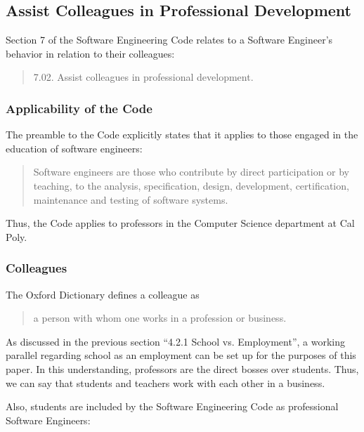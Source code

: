 \documentclass[11pt]{article}
\begin{document}
\begin{multicols}{2}
\subsection{Assist Colleagues in Professional Development}

Section 7 of the Software Engineering Code relates to a Software Engineer's behavior in relation to their colleagues:

\begin{quote}
7.02. Assist colleagues in professional development.\cite{secode}
\end{quote}

\subsubsection{Applicability of the Code}

The preamble to the Code explicitly states that it applies to those engaged in the education of software engineers:

\begin{quote}
Software engineers are those who contribute by direct participation or by teaching, to the analysis, specification, design, development, certification, maintenance and testing of software systems. \cite{secode}
\end{quote}

Thus, the Code applies to professors in the Computer Science department at Cal Poly.

\subsubsection{Colleagues}

The Oxford Dictionary defines a colleague as

\begin{quote}
a person with whom one works in a profession or business. \cite{definitionColleague}
\end{quote}

As discussed in the previous section ``4.2.1 School vs. Employment'', a working parallel regarding school as an employment can be set up for the purposes of this paper.  In this understanding, professors are the direct bosses over students.  Thus, we can say that students and teachers work with each other in a business.

Also, students are included by the Software Engineering Code as professional Software Engineers:


\end{multicols}
\end{document}
